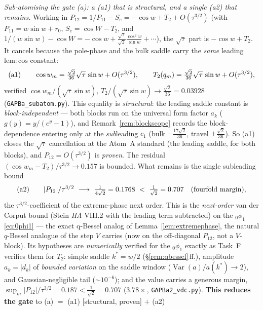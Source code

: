 \begin{remark}[The assembly: $R=O(\tau^{5/2})$ via the q-Bessel stationary-phase asymptotic coupled to the
travel-block phase]
\emph{Sub-atomising the gate (a): a \textup{(a1)} that is structural, and a single \textup{(a2)} that remains.}
Working in $P_{12}=1/P_{11}-S_e=-\cos w+T_2+O(\tau^{3/2})$ (with $P_{11}=w\sin w+r_0$, $S_e=\cos W-T_2$, and
$1/(w\sin w)-\cos W=-\cos w+\tfrac{\sqrt\tau}{\sqrt2}\tfrac{\cos^2w}{\sin w}+\cdots$), the $\sqrt\tau$ part is
$-\cos w+T_2$. It cancels because the pole-phase and the bulk saddle carry the \emph{same} leading $\mathrm{lem:cos}$
constant:
\begin{equation}\label{eq:a1}
   \text{\textup{(a1)}}\qquad \cos w_m=\tfrac{\sqrt2}{36}\sqrt\tau\,\sin w+O(\tau^{3/2}),\qquad
   T_2(q_m)=\tfrac{\sqrt2}{36}\sqrt\tau\,\sin w+O(\tau^{3/2}),
\end{equation}
verified $\cos w_m/(\sqrt\tau\sin w),\,T_2/(\sqrt\tau\sin w)\to\tfrac{\sqrt2}{36}=0.03928$ (\texttt{GAPBa\_subatom.py}).
This equality is \emph{structural}: the leading saddle constant is \emph{block-independent} --- both blocks run on
the universal form factor $a_k$ ($g(y)=y/(e^y{-}1)$), and Remark~\ref{rem:blockscope} records the block-dependence
entering only at the \emph{sub}leading $c_1$ (bulk $-\tfrac{17\sqrt2}{36}$, travel $+\tfrac{\sqrt2}{36}$). So
\textup{(a1)} closes the $\sqrt\tau$ cancellation at the Atom~A standard \textup(the leading saddle, for both
blocks\textup), and $P_{12}=O(\tau^{3/2})$ is \emph{proven}. The residual $(\cos w_m-T_2)/\tau^{3/2}\to0.157$ is
bounded. What remains is the single subleading bound
\begin{equation}\label{eq:a2}
   \text{\textup{(a2)}}\qquad |P_{12}|/\tau^{3/2}\ \longrightarrow\ \tfrac1{4\sqrt2}=0.1768\ <\ \tfrac1{\sqrt2}=0.707
   \quad(\text{fourfold margin}),
\end{equation}
the $\tau^{3/2}$-coefficient of the extreme-phase next order. This is the \emph{next-order} van der Corput bound
(Stein \emph{HA} VIII.2 with the leading term subtracted) on the $_0\phi_1$ \eqref{eq:0phi1} --- the exact
q-Bessel analog of Lemma~\ref{lem:extremephase}, the natural $q$-Bessel analogue of the step $V$ carries (now on
the off-diagonal $P_{12}$, not a $V$-block). Its hypotheses are \emph{numerically} verified for the $_0\phi_1$
exactly as Task~F verifies them for $T_2$: simple saddle $k^\ast=w/2$
(\S\ref{rem:qbessel}\,ff.), amplitude $a_k=|d_k|$ of \emph{bounded variation} on the saddle window
($\operatorname{Var}(a)/a(k^\ast)\to2$), and Gaussian-negligible tail ($\sim10^{-6}$); and the value carries a
generous margin, $\sup_m|P_{12}|/\tau^{3/2}=0.187<\tfrac1{\sqrt2}=0.707$ ($3.78\times$, \texttt{GAPBa2\_vdc.py}).
\textbf{This reduces the gate} to (a) $=$ \textup{(a1)} \textup[structural, proven\textup] $+$ \textup{(a2)}

\end{remark}
